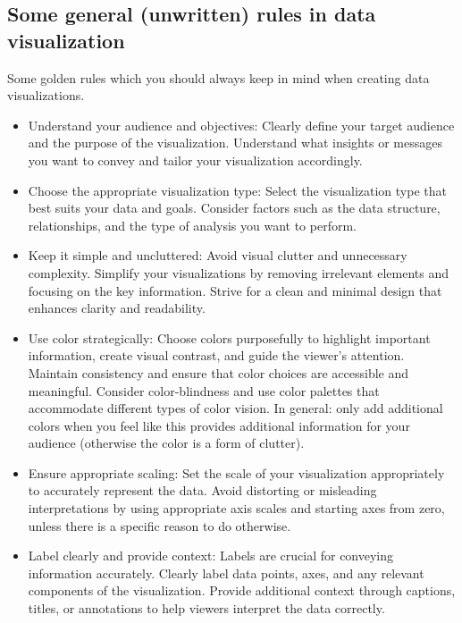 \documentclass[10pt]{extarticle}
\newcommand{\<}{\langle}
\renewcommand{\>}{\rangle}
\theoremstyle{mystyle}{\newtheorem*{remark}{Remark}}
\theoremstyle{mystyle}{\newtheorem*{remarks}{Remarks}}
\theoremstyle{mystyle}{\newtheorem*{example}{Example}}
\theoremstyle{mystyle}{\newtheorem*{examples}{Examples}}
\theoremstyle{definition}{\newtheorem*{exercise}{Exercise}}
\theoremstyle{warn}
\begin{document}
\subsection{Some general (unwritten) rules in data visualization}
Some golden rules which you should always keep in mind when creating data visualizations.

\begin{itemize}
\item Understand your audience and objectives: Clearly define your target audience and the purpose of the visualization. Understand what insights or messages you want to convey and tailor your visualization accordingly.

\item Choose the appropriate visualization type: Select the visualization type that best suits your data and goals. Consider factors such as the data structure, relationships, and the type of analysis you want to perform.

\item Keep it simple and uncluttered: Avoid visual clutter and unnecessary complexity. Simplify your visualizations by removing irrelevant elements and focusing on the key information. Strive for a clean and minimal design that enhances clarity and readability.

\item Use color strategically: Choose colors purposefully to highlight important information, create visual contrast, and guide the viewer's attention. Maintain consistency and ensure that color choices are accessible and meaningful. Consider color-blindness and use color palettes that accommodate different types of color vision. In general: only add additional colors when you feel like this provides additional information for your audience (otherwise the color is a form of clutter).

\item Ensure appropriate scaling: Set the scale of your visualization appropriately to accurately represent the data. Avoid distorting or misleading interpretations by using appropriate axis scales and starting axes from zero, unless there is a specific reason to do otherwise.

\item Label clearly and provide context: Labels are crucial for conveying information accurately. Clearly label data points, axes, and any relevant components of the visualization. Provide additional context through captions, titles, or annotations to help viewers interpret the data correctly.


\end{itemize}
\end{document}
